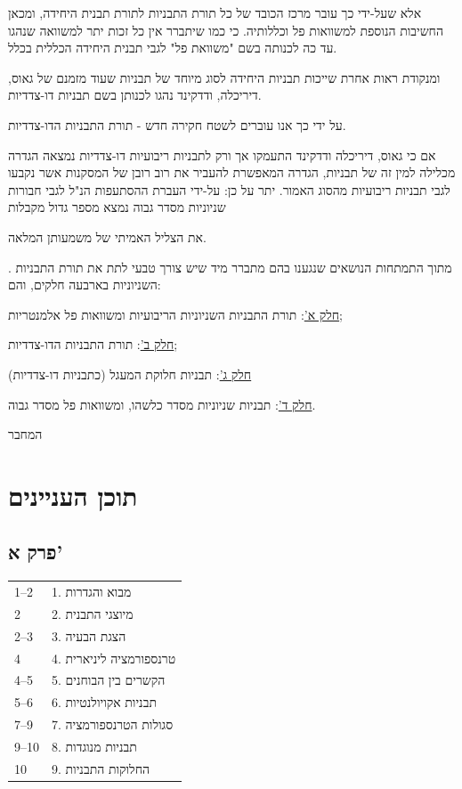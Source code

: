 \medskip
אלא שעל-ידי כך עובר מרכז הכובד של כל תורת התבניות לתורת תבנית היחידה, ומכאן החשיבות הנוספת למשוואות פל וכללותיה. כי כמו שיתברר אין כל זכות יתר למשוואה שנהגו עד כה לכנותה בשם "משוואת פל" לגבי תבנית היחידה הכללית בכלל.

\medskip
ומנקודת ראות אחרת שייכות תבניות היחידה לסוג מיוחד של תבניות שעוד מזמנם של גאוס, דיריכלה, ודדקינד נהגו לכנותן בשם תבניות דו-צדדיות.

\medskip
על ידי כך אנו עוברים לשטח חקירה חדש - תורת התבניות הדו-צדדיות.

\medskip
אם כי גאוס, דיריכלה ודדקינד התעמקו אך ורק לתבניות ריבועיות דו-צדדיות נמצאה הגדרה מכלילה למין זה של תבניות, הגדרה המאפשרת להעביר את רוב רובן של המסקנות אשר נקבעו לגבי תבניות ריבועיות מהסוג האמור. יתר על כן: על-ידי העברת ההסתעפות הנ"ל לגבי חבורות שניוניות מסדר גבוה נמצא מספר גדול מקבלות

את הצליל האמיתי של משמעותן המלאה.

\medskip
{}. מתוך התמתחות הנושאים שנגענו בהם מתברר מיד שיש צורך טבעי לתת את תורת התבניות השניוניות בארבעה חלקים, והם:

\medskip
\noindent \underline{חלק א'}: תורת התבניות השניוניות הריבועיות ומשוואות פל אלמנטריות;

\medskip
\noindent \underline{חלק ב'}: תורת התבניות הדו-צדדיות;

\medskip
\noindent \underline{חלק ג'}: תבניות חלוקת המעגל (כתבניות דו-צדדיות)

\medskip
\noindent \underline{חלק ד'}: תבניות שניוניות מסדר כלשהו, ומשוואות פל מסדר גבוה.

\bigskip
\begin{flushleft}
המחבר
\end{flushleft}

\newpage

\section*{תוכן העניינים}

\subsection*{פרק א'}
\begin{tabular}{ll}
1--2 & 1. מבוא והגדרות \\
2 & 2. מיוצגי התבנית \\
2--3 & 3. הצגת הבעיה \\
4 & 4. טרנספורמציה ליניארית \\
4--5 & 5. הקשרים בין הבוחנים \\
5--6 & 6. תבניות אקויולנטיות \\
7--9 & 7. סגולות הטרנספורמציה \\
9--10 & 8. תבניות מנוגדות \\
10 & 9. החלוקות התבניות \\
\end{tabular}

